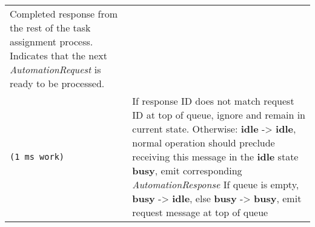 \begin{longtable}[c]{@{}ll@{}}
\begin{minipage}[t]{0.65\columnwidth}
Completed response from the rest of the task assignment process.
Indicates that the next \emph{AutomationRequest} is ready to be
processed.
\strut\end{minipage}\tabularnewline
\begin{minipage}[t]{0.29\columnwidth}\raggedright\strut
\begin{verbatim}
(1 ms work)
\end{verbatim}
\strut\end{minipage} &
\begin{minipage}[t]{0.65\columnwidth}\raggedright\strut
If response ID does not match request ID at top of queue, ignore and
remain in current state. Otherwise: \textbf{idle} -\textgreater{}
\textbf{idle}, normal operation should preclude receiving this message
in the \textbf{idle} state \textbf{busy}, emit corresponding
\emph{AutomationResponse} If queue is empty, \textbf{busy}
-\textgreater{} \textbf{idle}, else \textbf{busy} -\textgreater{}
\textbf{busy}, emit request message at top of queue
\strut\end{minipage}\tabularnewline
\bottomrule
\end{longtable}


